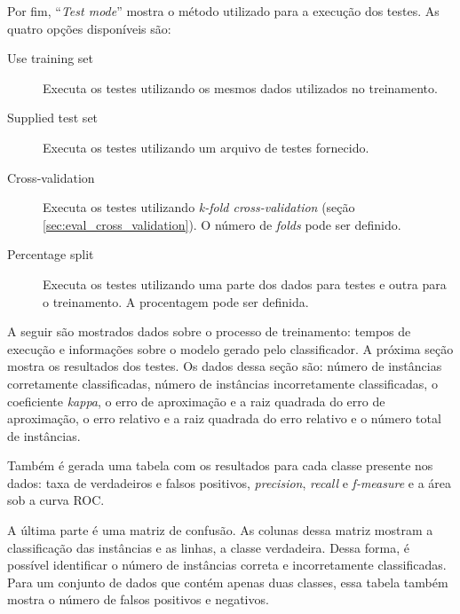 Por fim, ``\emph{Test mode}'' mostra o método utilizado para a execução dos testes. As quatro opções disponíveis são:

\begin{description}
    \item[Use training set] Executa os testes utilizando os mesmos dados utilizados no treinamento.
    \item[Supplied test set] Executa os testes utilizando um arquivo de testes fornecido.
    \item[Cross-validation] Executa os testes utilizando \emph{\emph{k}-fold cross-validation} (seção \ref{sec:eval_cross_validation}). O número de \emph{folds} pode ser definido.
    \item[Percentage split] Executa os testes utilizando uma parte dos dados para testes e outra para o treinamento. A procentagem pode ser definida.
\end{description}

A seguir são mostrados dados sobre o processo de treinamento: tempos de execução e informações sobre o modelo gerado pelo classificador. A próxima seção mostra os resultados dos testes. Os dados dessa seção são: número de instâncias corretamente classificadas, número de instâncias incorretamente classificadas, o coeficiente \emph{kappa}, o erro de aproximação e a raiz quadrada do erro de aproximação, o erro relativo e a raiz quadrada do erro relativo e o número total de instâncias.

Também é gerada uma tabela com os resultados para cada classe presente nos dados: taxa de verdadeiros e falsos positivos, \emph{precision}, \emph{recall} e \emph{f-measure} e a área sob a curva ROC.

A última parte é uma matriz de confusão. As colunas dessa matriz mostram a classificação das instâncias e as linhas, a classe verdadeira. Dessa forma, é possível identificar o número de instâncias correta e incorretamente classificadas. Para um conjunto de dados que contém apenas duas classes, essa tabela também mostra o número de falsos positivos e negativos.

